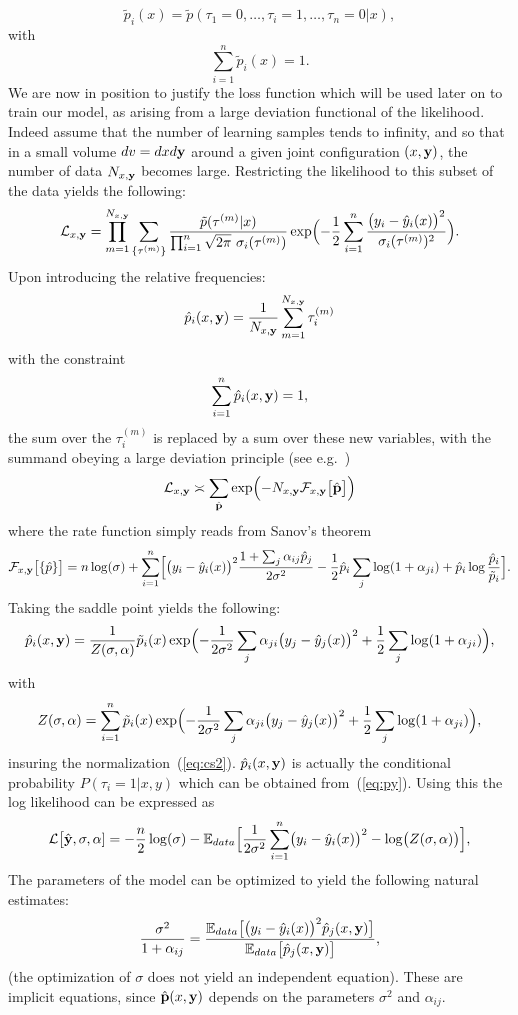 \documentclass[envcountsect,runningheads]{llncs}
\theoremstyle{etoile}
\begin{document}
\[
\tilde p_i(x) = \tilde p(\tau_1=0,\ldots,\tau_i=1,\ldots,\tau_n=0\vert x),
\]
with 
\[
\sum_{i=1}^n \tilde p_i(x) = 1.
\]
We are now in position to justify the loss function which will be used later on to train our model, as arising from a large deviation functional of the likelihood. Indeed assume that the number of learning samples tends to infinity, and so that in a small volume $dv = dxd\bf y$ around a given  joint configuration $(x,\bf y)$, the number of data $N_{x,\bf y}$ becomes large. Restricting the likelihood to this subset of the data yields the following:
\[
{\cal L}_{x,{\bf y}} = \prod_{m=1}^{N_{x,{\bf y}}} \sum_{\{\tau^{(m)}\}} 
\frac{\tilde p(\tau^{(m)}\vert x)}{\prod_{i=1}^n\sqrt{2\pi}\ \sigma_i(\tau^{(m)})}
\exp\Bigl(-\frac{1}{2}\sum_{i=1}^n\frac{\bigl(y_i-\hat y_i(x)\bigr)^2}{\sigma_i(\tau^{(m)})^2}\Bigr).
\]
Upon introducing the relative frequencies:
\[
\hat p_i(x,{\bf y}) = \frac{1}{N_{x,{\bf y}}}\sum_{m=1}^{N_{x,{\bf y}}} \tau_i^{(m)} 
\]
with the constraint
\begin{equation}\label{eq:cs2}
\sum_{i=1}^n \hat p_i(x,{\bf y}) = 1,
\end{equation}
the sum over the $\tau_i^{(m)}$ is replaced by a sum over these new variables, with the summand obeying a large deviation principle (see e.g.~\cite{Touchette})
\[
{\cal L}_{x,{\bf y}} \asymp \sum_{\hat {\bf p}} 
\exp\Bigl(-N_{x,{\bf y}} {\cal F}_{x,{\bf y}}\bigl[\hat {\bf p}\bigr]\Bigr)
\]
where the rate function simply reads from Sanov's theorem
\[
{\cal F}_{x,{\bf y}}\bigl[\{\hat p\}\bigr] = n\log(\sigma)+
\sum_{i=1}^n\Bigl[\bigl(y_i-\hat y_i(x)\bigr)^2\frac{1+\sum_j\alpha_{ij}\hat p_j}{2\sigma^2}
-\frac{1}{2}\hat p_i\sum_j\log(1+\alpha_{ji})+\hat p_i\log\frac{\hat p_i}{\tilde p_i}\Bigr].
\]
Taking the saddle point yields the following:
\begin{equation}\label{eq:hatpi}
\hat p_i(x,{\bf y}) = \frac{1}{Z(\sigma,{\bf \alpha})}\tilde p_i(x)\exp\Bigl(-\frac{1}{2\sigma^2}\sum_j\alpha_{ji}\bigl(y_j-\hat y_j(x)\bigr)^2+\frac{1}{2}\sum_j\log(1+\alpha_{ji})\Bigr),
\end{equation}
with
\[
Z(\sigma,{\bf \alpha}) = \sum_{i=1}^n\tilde p_i(x)\exp\Bigl(-\frac{1}{2\sigma^2}\sum_j\alpha_{ji}\bigl(y_j-\hat y_j(x)\bigr)^2+\frac{1}{2}\sum_j\log(1+\alpha_{ji})\Bigr),
\]
insuring the normalization~(\ref{eq:cs2}). $\hat p_i(x,{\bf y})$ is actually the conditional probability $P(\tau_i=1\vert x,y)$ which can be obtained from~(\ref{eq:py}).
Using this the log likelihood can be expressed as
\[
  {\cal L}\bigl[\hat {\bf y},\sigma,{\bf \alpha}] = -\frac{n}{2}\log(\sigma)-{\mathbb E}_{data}\Bigl[\frac{1}{2\sigma^2}\sum_{i=1}^n\bigl(y_i-\hat y_i(x)\bigr)^2
    -\log\bigl(Z(\sigma,{\bf \alpha})\bigr)\Bigr],
\]
The parameters of the model can be optimized to yield the following natural estimates:
\begin{equation}\label{eq:var}
\frac{\sigma^2}{1+\alpha_{ij}} = \frac{{\mathbb E}_{data}\bigl[\bigl(y_i-\hat y_i(x)\bigr)^2\hat p_j(x,{\bf y})\bigr]}{{\mathbb E}_{data}\bigl[\hat p_j(x,{\bf y})\bigr]},
\end{equation}
(the optimization of $\sigma$ does not yield an independent equation).
These are implicit equations, since $\hat {\bf p}(x,{\bf y})$ depends on the parameters $\sigma^2$ and $\alpha_{ij}$.
\end{document}
